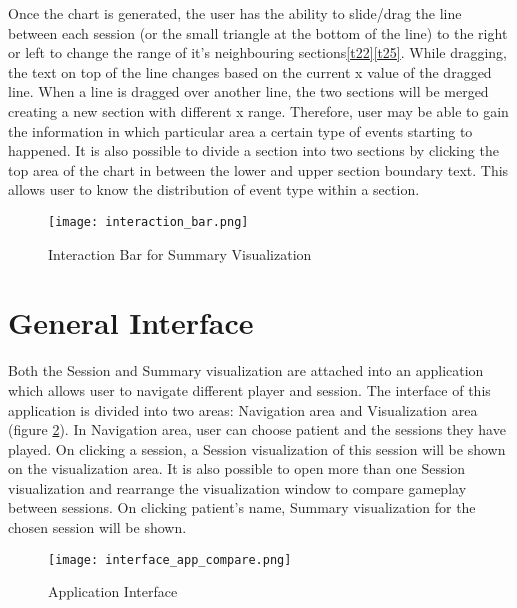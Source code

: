 Once the chart is generated, the user has the ability to slide/drag the line between each session (or the small triangle at the bottom of the line) to the right or left to change the range of it's neighbouring sections\ref{t22}\ref{t25}. While dragging, the text on top of the line changes based on the current x value of the dragged line. When a line is dragged over another line, the two sections will be merged creating a new section with different x range. Therefore, user may be able to gain the information in which particular area a certain type of events starting to happened. It is also possible to divide a section into two sections by clicking the top area of the chart in between the lower and upper section boundary text. This allows user to know the distribution of event type within a section.

\begin{figure}
\centering
\texttt{[image: interaction\_bar.png]}
\caption{Interaction Bar for Summary Visualization}
\label{fig:interaction_bar}
\end{figure}
\section{General Interface}
Both the Session and Summary visualization are attached into an application which allows user to navigate different player and session. The interface of this application is divided into two areas: Navigation area and Visualization area (figure \ref{fig:app_interface}). In Navigation area, user can choose patient and the sessions they have played. On clicking a session, a Session visualization of this session will be shown on the visualization area. It is also possible to open more than one Session visualization and rearrange the visualization window to compare gameplay between sessions. On clicking patient's name, Summary visualization for the chosen session will be shown.

\begin{figure}
\centering
\texttt{[image: interface\_app\_compare.png]}
\caption{Application Interface}
\label{fig:app_interface}
\end{figure}
